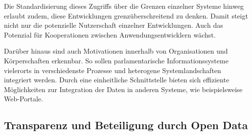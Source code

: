 \documentclass[,a4paper]{article}
\begin{document}
Die Standardisierung dieses Zugriffs über die Grenzen einzelner Systeme
hinweg erlaubt zudem, diese Entwicklungen grenzüberschreitend zu denken.
Damit steigt nicht nur die potenzielle Nutzerschaft einzelner
Entwicklungen. Auch das Potenzial für Kooperationen zwischen
Anwendungsentwicklern wächst.

Darüber hinaus sind auch Motivationen innerhalb von Organisationen und
Körperschaften erkennbar. So sollen parlamentarische Informationssysteme
vielerorts in verschiedenste Prozesse und heterogene Systemlandschaften
integriert werden. Durch eine einheitliche Schnittstelle bieten sich
effiziente Möglichkeiten zur Integration der Daten in anderen Systeme,
wie beispielsweise Web-Portale.

\subsection{Transparenz und Beteiligung durch Open Data}
\end{document}
